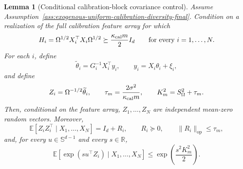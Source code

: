 \documentclass{article} %
\newtheorem{lemma}[theorem]{Lemma}
\begin{document}
\begin{lemma}[Conditional calibration-block covariance control]
\label{lem:calibration-block-covariance-control-final}
Assume Assumption~\ref{ass:exogenous-uniform-calibration-diversity-final}.
Condition on a realization of the full calibration feature array for which
\[
H_i=\Omega^{1/2}X_i^\top X_i\Omega^{1/2}
\succeq
\frac{\kappa_{\rm cal}m}{2}I_d
\qquad
\text{for every }i=1,\ldots,N.
\]
For each \(i\), define
\[
\widetilde\theta_i=G_i^{-1}X_i^\top y_i,
\qquad
y_i=X_i\theta_i+\xi_i,
\]
and define
\[
Z_i=\Omega^{-1/2}\widetilde\theta_i,
\qquad
\tau_m=\frac{2\sigma^2}{\kappa_{\rm cal}m},
\qquad
K_m^2=S_\Omega^2+\tau_m.
\]
Then, conditional on the feature array, \(Z_1,\ldots,Z_N\) are independent
mean-zero random vectors.  Moreover,
\[
\mathbb{E}[Z_iZ_i^\top\mid X_1,\ldots,X_N]=I_d+R_i,
\qquad
R_i\succeq0,
\qquad
\|R_i\|_{\mathrm{op}}\le \tau_m,
\]
and, for every \(u\in\mathbb{S}^{d-1}\) and every \(s\in\mathbb{R}\),
\[
\mathbb{E}\!\left[
\exp(su^\top Z_i)\mid X_1,\ldots,X_N
\right]
\le
\exp\!\left(\frac{s^2K_m^2}{2}\right).
\]
\end{lemma}
\end{document}
